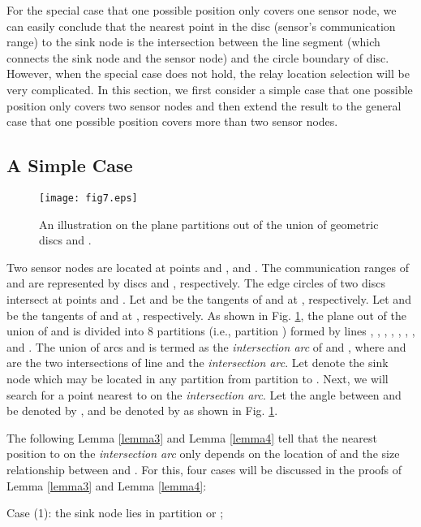 \documentclass[journal]{IEEEtran}
\begin{document}
For the special case that one possible position only covers one sensor node, we can easily conclude that the nearest point in the disc (sensor's communication range) to the sink node is the intersection between the line segment (which connects the sink node and the sensor node) and the circle boundary of disc. However, when the special case does not hold, the relay location selection will be very complicated. In this section, we first consider a simple case that one possible position only covers two sensor nodes and then extend the result to the general case that one possible position covers more than two sensor nodes.
\subsection{A Simple Case}
\begin{figure}
\begin{center}
\texttt{[image: fig7.eps]}    \caption{An illustration on the plane partitions out of the union of geometric discs  and .}
\label{fig7}                                 \end{center}                                 \end{figure}

Two sensor nodes are located at points  and  , and . The communication ranges of 
and  are represented by discs  and , respectively. The edge circles of two discs intersect at points  and . Let 
and  be the tangents of  and  at , respectively. Let  and  be the tangents of  and  at , respectively.
As shown in Fig. \ref{fig7}, the plane out of the union of  and  is divided into 8 partitions (i.e., partition ) formed by lines
, , , , , , , and . The union of arcs  and  is termed as
the \emph{intersection arc} of  and , where  and  are the two intersections of line  and the \emph{intersection arc}.
Let  denote the sink node which may be located in any partition from partition  to . Next, we will search for a point nearest to  on the \emph{intersection arc}.
Let the angle between  and  be denoted by , and  be denoted by  as shown in Fig. \ref{fig7}.

The following Lemma \ref{lemma3} and Lemma \ref{lemma4} tell that the nearest position to  on the \emph{intersection arc} only depends on the location of  and the size relationship between  and . For this, four cases will be discussed in the proofs of Lemma \ref{lemma3} and Lemma \ref{lemma4}:

Case (1): the sink node  lies in partition  or ;
\end{document}

